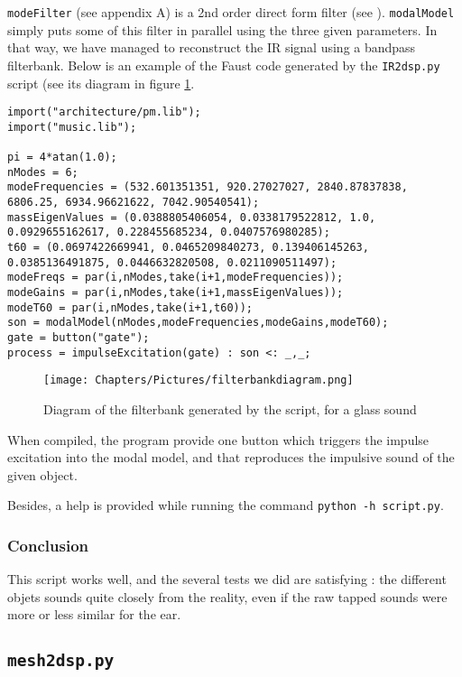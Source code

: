 \texttt{modeFilter} (see appendix A) is a 2nd order direct form filter (see \cite{digitalfilters}). \texttt{modalModel} simply puts some of this filter in parallel using the three given parameters. In that way, we have managed to reconstruct the IR signal using a bandpass filterbank.
Below is an example of the Faust code generated by the \texttt{IR2dsp.py} script (see its diagram in figure \ref{fig:filterbankdiagram}.

\begin{lstlisting}
import("architecture/pm.lib");
import("music.lib");

pi = 4*atan(1.0);
nModes = 6;
modeFrequencies = (532.601351351, 920.27027027, 2840.87837838, 6806.25, 6934.96621622, 7042.90540541);
massEigenValues = (0.0388805406054, 0.0338179522812, 1.0, 0.0929655162617, 0.228455685234, 0.0407576980285);
t60 = (0.0697422669941, 0.0465209840273, 0.139406145263, 0.0385136491875, 0.0446632820508, 0.0211090511497);
modeFreqs = par(i,nModes,take(i+1,modeFrequencies));
modeGains = par(i,nModes,take(i+1,massEigenValues));
modeT60 = par(i,nModes,take(i+1,t60));
son = modalModel(nModes,modeFrequencies,modeGains,modeT60);
gate = button("gate");
process = impulseExcitation(gate) : son <: _,_;
\end{lstlisting}

\begin{figure}[h]
    \centering
    \texttt{[image: Chapters/Pictures/filterbankdiagram.png]}
    \caption{Diagram of the filterbank generated by the script, for a glass sound}
    \label{fig:filterbankdiagram}
\end{figure}

When compiled, the program provide one button which triggers the impulse excitation into the modal model, and that reproduces the impulsive sound of the given object.

Besides, a help is provided while running the command \texttt{python -h script.py}.

\subsubsection*{Conclusion}
This script works well, and the several tests we did are satisfying : the different objets sounds quite closely from the reality, even if the raw tapped sounds were more or less similar for the ear.

\subsection{\texttt{mesh2dsp.py}}

